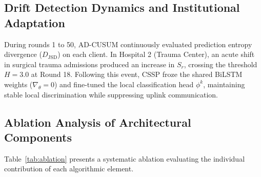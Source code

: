 \documentclass[11pt,a4paper]{article}
\begin{document}
\subsection{Drift Detection Dynamics and Institutional Adaptation}
During rounds 1 to 50, AD-CUSUM continuously evaluated prediction entropy divergence ($D_{\text{JSD}}$) on each client. In Hospital 2 (Trauma Center), an acute shift in surgical trauma admissions produced an increase in $S_r$, crossing the threshold $H=3.0$ at Round 18. Following this event, CSSP froze the shared BiLSTM weights ($\nabla_\theta = 0$) and fine-tuned the local classification head $\phi^k$, maintaining stable local discrimination while suppressing uplink communication.

\subsection{Ablation Analysis of Architectural Components}
Table~\ref{tab:ablation} presents a systematic ablation evaluating the individual contribution of each algorithmic element.

\begin{table}[t]
\centering
\small
\caption{Systematic Component Ablation Results}
\label{tab:ablation}
\end{table}
\end{document}
